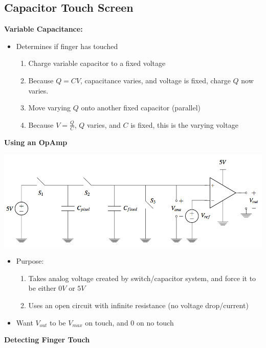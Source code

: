 \documentclass{article}\usepackage{amsmath,amssymb,amsthm,tikz,tkz-graph,color,chngpage,soul,hyperref,csquotes,graphicx,floatrow}\newcommand*{\QEDB}{\hfill\ensuremath{\square}}\newtheorem*{prop}{Proposition}\renewcommand{\theenumi}{\alph{enumi}}\usepackage[shortlabels]{enumitem}\usepackage[nobreak=true]{mdframed}\usetikzlibrary{matrix,calc}\MakeOuterQuote{"}\usepackage[margin=0.75in]{geometry} \newtheorem{theorem}{Theorem}
\begin{document}
\subsection*{Capacitor Touch Screen}
\textbf{Variable Capacitance:}
\begin{itemize}
    \item Determines if finger has touched
    \begin{enumerate}
        \item Charge variable capacitor to a fixed voltage
        \item Because $Q = CV$, capacitance varies, and voltage is fixed, charge $Q$ now varies.
        \item Move varying $Q$ onto another fixed capacitor (parallel)
        \item Because $V = \frac{Q}{C}$, $Q$ varies, and $C$ is fixed, this is the varying voltage
    \end{enumerate}
\end{itemize}
\textbf{Using an OpAmp}
\begin{center}\includegraphics{cts}\end{center}
\begin{itemize}
    \item Purpose:
    \begin{enumerate}
        \item Takes analog voltage created by switch/capacitor system, and force it to be either $0V$ or $5V$
        \item Uses an open circuit with infinite resistance (no voltage drop/current)
    \end{enumerate}
    \item Want $V_{out}$ to be $V_{max}$ on touch, and $0$ on no touch
\end{itemize}
\textbf{Detecting Finger Touch}
\end{document}
